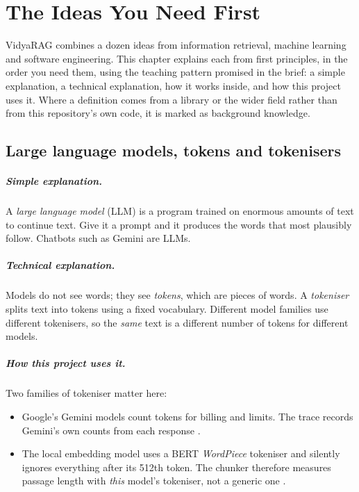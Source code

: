 \chapter{The Ideas You Need First}
\label{ch:concepts}

VidyaRAG combines a dozen ideas from information retrieval, machine learning and software engineering. This chapter explains each from first principles, in the order you need them, using the teaching pattern promised in the brief: a simple explanation, a technical explanation, how it works inside, and how this project uses it. Where a definition comes from a library or the wider field rather than from this repository's own code, it is marked as background knowledge.

\section{Large language models, tokens and tokenisers}
\label{sec:llm}

\paragraph{Simple explanation.} A \emph{large language model} (LLM) is a program trained on enormous amounts of text to continue text. Give it a prompt and it produces the words that most plausibly follow. Chatbots such as Gemini are LLMs.

\paragraph{Technical explanation.} Models do not see words; they see \emph{tokens}, which are pieces of words. A \emph{tokeniser} splits text into tokens using a fixed vocabulary. Different model families use different tokenisers, so the \emph{same} text is a different number of tokens for different models.

\paragraph{How this project uses it.} Two families of tokeniser matter here:
\begin{itemize}
  \item Google's Gemini models count tokens for billing and limits. The trace records Gemini's own counts from each response .
  \item The local embedding model  uses a BERT \emph{WordPiece} tokeniser and silently ignores everything after its 512th token. The chunker therefore measures passage length with \emph{this} model's tokeniser, not a generic one .
\end{itemize}

